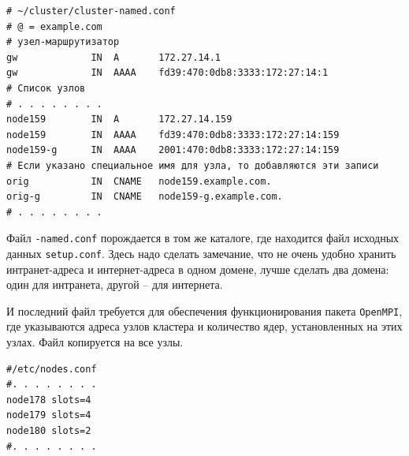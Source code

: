 \documentclass[a4paper,12pt,final,openany]{extbook}
\begin{document}
\begin{verbatim}
# ~/cluster/cluster-named.conf
# @ = example.com
# узел-маршрутизатор
gw             IN  A       172.27.14.1
gw             IN  AAAA    fd39:470:0db8:3333:172:27:14:1
# Список узлов
# . . . . . . . .
node159        IN  A       172.27.14.159
node159        IN  AAAA    fd39:470:0db8:3333:172:27:14:159
node159-g      IN  AAAA    2001:470:0db8:3333:172:27:14:159
# Если указано специальное имя для узла, то добавляются эти записи
orig           IN  CNAME   node159.example.com.
orig-g         IN  CNAME   node159-g.example.com.
# . . . . . . . .
\end{verbatim}
Файл \texttt{-named.conf} порождается в том же каталоге, где находится файл исходных данных \texttt{setup.conf}. Здесь надо сделать замечание, что не очень удобно хранить интранет-адреса и интернет-адреса в одном домене, лучше сделать два домена: один для интранета, другой -- для интернета.

И последний файл требуется для обеспечения функционирования пакета \texttt{OpenMPI}, где указываются адреса узлов кластера и количество ядер, установленных на этих узлах. Файл копируется на все узлы.
\begin{verbatim}
#/etc/nodes.conf
#. . . . . . . .
node178 slots=4
node179 slots=4
node180 slots=2
#. . . . . . . .
\end{verbatim}
\end{document}
